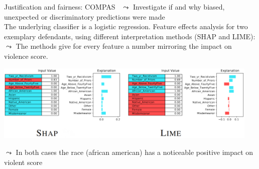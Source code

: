 \documentclass[11pt,compress,t,notes=noshow, aspectratio=169, xcolor=table]{beamer}
\begin{document}
\begin{frame}{Justification and fairness: COMPAS~}
    $\leadsto$ Investigate if and why biased, unexpected or discriminatory predictions were made \\
    \medskip
    The underlying classifier is a logistic regression. Feature effects analysis for two exemplary defendants, using different interpretation methods (SHAP and LIME): \\
    $\leadsto$ The methods give for every feature a number mirroring the impact on violence score. 
    \vspace{0.5cm}
    
    \centering
    \includegraphics[width=0.95\textwidth]{figure/COMPAS_shap_lime_example.png}
    
    \vspace{0.2cm}
    $\leadsto$ In both cases the race (african american) has a noticeable positive impact on violent score
\end{frame}









\end{document}
